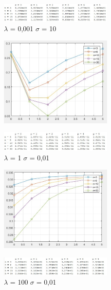 \begin{figure}[h]
	\centering
	\includegraphics[width=0.5\textwidth]{tl0001s10.png}
	\caption{$\lambda$ = 0,001 $\sigma$ = 10}
	\label{fig:lambda = 0,001 sigma = 10}
\end{figure}

\begin{figure}[h]
	\centering
	\includegraphics[width=0.5\textwidth]{pl1s001.png}
\end{figure}

\begin{figure}[h]
	\centering
	\includegraphics[width=0.5\textwidth]{tl1s001.png}
	\caption{$\lambda$ = 1 $\sigma$ = 0,01}
	\label{fig:lambda = 1 sigma = 0,01}
\end{figure}

\begin{figure}[h]
	\centering
	\includegraphics[width=0.5\textwidth]{pl100s01.png}
\end{figure}

\begin{figure}[h]
	\centering
	\includegraphics[width=0.5\textwidth]{tl100s01.png}
	\caption{$\lambda$ = 100 $\sigma$ = 0,01}
	\label{fig:lambda = 100 sigma = 0,01}
\end{figure}

